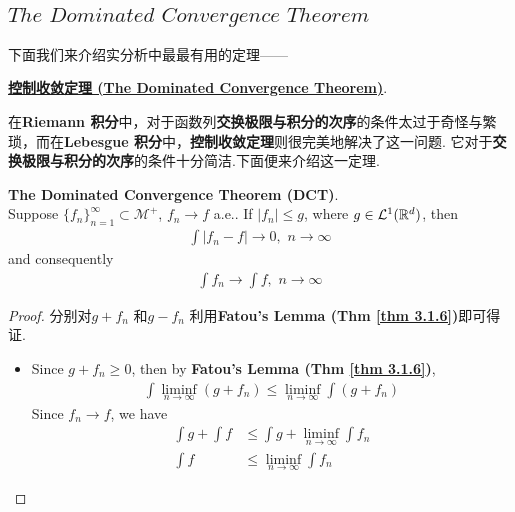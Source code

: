  \newpage
 
 \subsection{$The \,\, Dominated \,\, Convergence \,\, Theorem$}
 	下面我们来介绍实分析中最最有用的定理——
 	\begin{center}
 		\underline{\textbf{控制收敛定理 (The Dominated Convergence Theorem)}}.
 	\end{center}
 	
 	\vspace{2em}
 	在\textbf{Riemann 积分}中，对于函数列\textbf{交换极限与积分的次序}的条件太过于奇怪与繁琐，而在\textbf{Lebesgue 积分}中，\textbf{控制收敛定理}则很完美地解决了这一问题. 它对于\textbf{交换极限与积分的次序}的条件十分简洁.下面便来介绍这一定理.
 	\begin{thm}\label{thm 3.1.7}
 		\textbf{The Dominated Convergence Theorem (DCT)}. \\
 		Suppose $\{ f_n \}_{n = 1}^{\infty} \subset \mathcal{M}^{+}$, $f_n \rightarrow f$ a.e.. If $\left| f_n \right| \leq g$, where $g \in \mathcal{L}^{1}(\mathbb{R}^d)$, then
 		\begin{align}
 			\int{\left| f_n - f \right|} \to 0 , \,\, n \to \infty
 		\end{align}
 		and consequently
 		\begin{align}
 			\int{f_n} \to \int{f} , \,\, n \to \infty
 		\end{align}
 	
 		\vspace{3em}
 		\begin{proof}
 			分别对$g + f_n$ 和$g - f_n$ 利用\textbf{Fatou's Lemma (Thm \ref{thm 3.1.6})}即可得证.
 			\begin{itemize}
 				\item Since $g + f_n \geq 0$, then by \textbf{Fatou's Lemma (Thm \ref{thm 3.1.6})},
 				\begin{align}
 					\int{\liminf_{n \to \infty}{(g + f_n)}} \leq \liminf_{n \to \infty}{\int{(g + f_n)}} 
 				\end{align}
 				Since $f_n \to f$, we have
 				\begin{align}
 					\int{g} + \int{f} &\leq \int{g} + \liminf_{n \to \infty}{\int{f_n}} \\
 					\int{f} &\leq \liminf_{n \to \infty}{\int{f_n}}
 				\end{align}
 				
 				\vspace{1em}
 				

\end{itemize}
\end{proof}
\end{thm}
